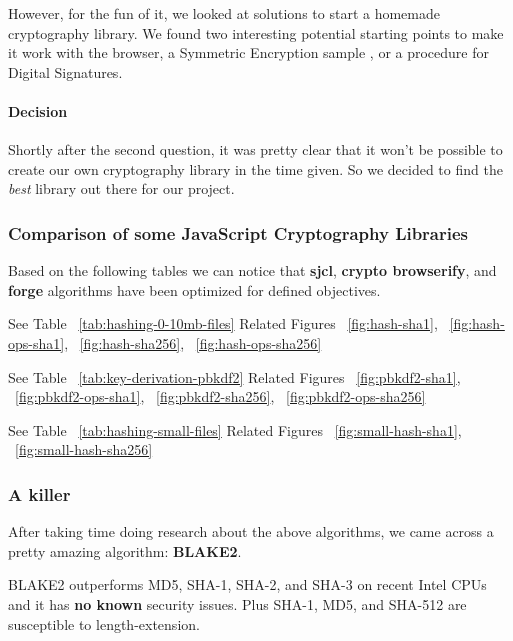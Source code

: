 However, for the fun of it, we looked at solutions to start a homemade cryptography library. We found two interesting potential starting points to make it work with the browser, a Symmetric Encryption sample \cite{InfoTech2014SymmetricSample}, or a procedure for Digital Signatures\cite{InfoTech2014DigitalBrowser}.

\paragraph{Decision} Shortly after the second question, it was pretty clear that it won't be possible to create our own cryptography library in the time given. So we decided to find the \textit{best} library out there for our project.

\subsubsection{Comparison of some JavaScript Cryptography Libraries}

Based on the following tables we can notice that \textbf{sjcl}\cite{Stark2009SymmetricJavascript}, \textbf{crypto browserify}\cite{Tarr2013Crypto-Browserify}, and \textbf{forge}\cite{DigitalBazaar2016Forge} algorithms have been optimized for defined objectives.

See Table ~\ref{tab:hashing-0-10mb-files}
Related Figures ~\ref{fig:hash-sha1}, ~\ref{fig:hash-ops-sha1}, ~\ref{fig:hash-sha256}, ~\ref{fig:hash-ops-sha256}

See Table ~\ref{tab:key-derivation-pbkdf2}
Related Figures ~\ref{fig:pbkdf2-sha1}, ~\ref{fig:pbkdf2-ops-sha1}, ~\ref{fig:pbkdf2-sha256}, ~\ref{fig:pbkdf2-ops-sha256}

See Table ~\ref{tab:hashing-small-files}
Related Figures ~\ref{fig:small-hash-sha1}, ~\ref{fig:small-hash-sha256}

\subsubsection{A killer}

After taking time doing research about the above algorithms, we came across a pretty amazing algorithm: \textbf{BLAKE2}\cite{Guo2014AnalysisBLAKE2,SaarinenM-J.2015TheMAC}.

BLAKE2 outperforms MD5, SHA-1, SHA-2, and SHA-3 on recent Intel CPUs and it has \textbf{no known} security issues. Plus SHA-1, MD5, and SHA-512 are susceptible to length-extension.

